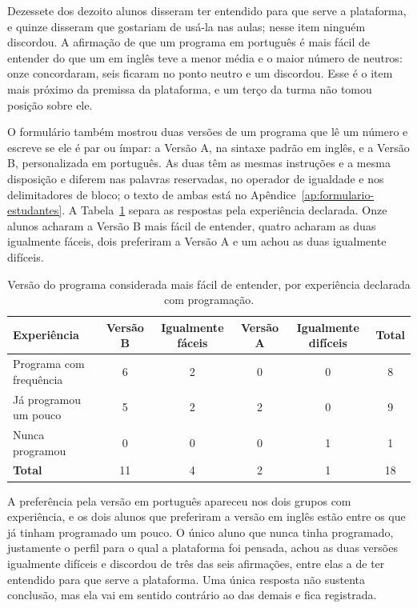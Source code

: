 Dezessete dos dezoito alunos disseram ter entendido para que serve a plataforma, e quinze disseram que gostariam de usá-la nas aulas; nesse item ninguém discordou. A afirmação de que um programa em português é mais fácil de entender do que um em inglês teve a menor média e o maior número de neutros: onze concordaram, seis ficaram no ponto neutro e um discordou. Esse é o item mais próximo da premissa da plataforma, e um terço da turma não tomou posição sobre ele.

O formulário também mostrou duas versões de um programa que lê um número e escreve se ele é par ou ímpar: a Versão A, na sintaxe padrão em inglês, e a Versão B, personalizada em português. As duas têm as mesmas instruções e a mesma disposição e diferem nas palavras reservadas, no operador de igualdade e nos delimitadores de bloco; o texto de ambas está no Apêndice~\ref{ap:formulario-estudantes}. A Tabela~\ref{tab:resultado-versoes} separa as respostas pela experiência declarada. Onze alunos acharam a Versão B mais fácil de entender, quatro acharam as duas igualmente fáceis, dois preferiram a Versão A e um achou as duas igualmente difíceis.

\begin{table}[htbp]
\centering
\caption{Versão do programa considerada mais fácil de entender, por experiência declarada com programação.}
\label{tab:resultado-versoes}
\footnotesize
\renewcommand{\arraystretch}{1.2}
\begin{tabular}{|p{4.3cm}|c|c|c|c|c|}
\hline
\textbf{Experiência} & \textbf{Versão B} & \textbf{Igualmente fáceis} & \textbf{Versão A} & \textbf{Igualmente difíceis} & \textbf{Total} \\\hline
Programa com frequência & 6 & 2 & 0 & 0 & 8 \\\hline
Já programou um pouco & 5 & 2 & 2 & 0 & 9 \\\hline
Nunca programou & 0 & 0 & 0 & 1 & 1 \\\hline
\textbf{Total} & 11 & 4 & 2 & 1 & 18 \\\hline
\end{tabular}
\end{table}

A preferência pela versão em português apareceu nos dois grupos com experiência, e os dois alunos que preferiram a versão em inglês estão entre os que já tinham programado um pouco. O único aluno que nunca tinha programado, justamente o perfil para o qual a plataforma foi pensada, achou as duas versões igualmente difíceis e discordou de três das seis afirmações, entre elas a de ter entendido para que serve a plataforma. Uma única resposta não sustenta conclusão, mas ela vai em sentido contrário ao das demais e fica registrada.

